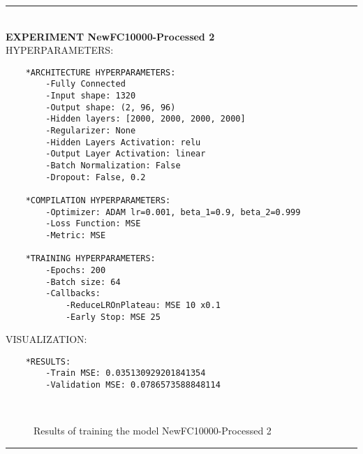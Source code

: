 \rule{0.5\textwidth}{0.5pt}\\

	{\large \textbf{EXPERIMENT NewFC10000-Processed 2}}\\
	
	{\normalsize HYPERPARAMETERS:}\\
	\begin{lstlisting}	
	*ARCHITECTURE HYPERPARAMETERS:
		-Fully Connected
		-Input shape: 1320
		-Output shape: (2, 96, 96)
		-Hidden layers: [2000, 2000, 2000, 2000]
		-Regularizer: None
		-Hidden Layers Activation: relu
		-Output Layer Activation: linear
		-Batch Normalization: False
		-Dropout: False, 0.2
	
	*COMPILATION HYPERPARAMETERS:
		-Optimizer: ADAM lr=0.001, beta_1=0.9, beta_2=0.999
		-Loss Function: MSE
		-Metric: MSE
	
	*TRAINING HYPERPARAMETERS:
		-Epochs: 200
		-Batch size: 64
		-Callbacks: 
			-ReduceLROnPlateau: MSE 10 x0.1
			-Early Stop: MSE 25
	\end{lstlisting}
	
	{\normalsize VISUALIZATION:}
	\begin{lstlisting}
	*RESULTS:
        -Train MSE: 0.035130929201841354
        -Validation MSE: 0.0786573588848114
	\end{lstlisting}
	
	\begin{figure*}[ht!]
		\hspace{\fill}
		\hspace{\fill}
		\\
		\caption{Results of training the model NewFC10000-Processed 2}
	\end{figure*}
\rule{0.5\textwidth}{0.5pt}\\
	